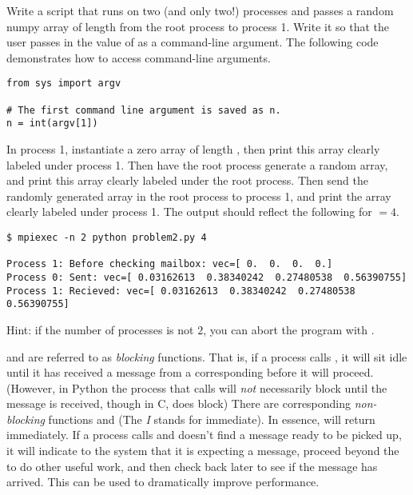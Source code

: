 \begin{problem}
Write a script that runs on two (and only two!) processes and passes a random numpy array of length  from the root process to process 1.
Write it so that the user passes in the value of  as a command-line argument. 
The following code demonstrates how to access command-line arguments.
\begin{lstlisting}
from sys import argv
    
# The first command line argument is saved as n.
n = int(argv[1])
\end{lstlisting}
In process 1, instantiate a zero array of length , then print this array clearly labeled under process 1.
Then have the root process generate a random array, and print this array clearly labeled under the root process.
Then send the randomly generated array in the root process to process 1, and print the array clearly labeled under process 1.
The output should reflect the following for  $ = 4$.
\begin{lstlisting}[style=ShellOutput]
$ mpiexec -n 2 python problem2.py 4

Process 1: Before checking mailbox: vec=[ 0.  0.  0.  0.]
Process 0: Sent: vec=[ 0.03162613  0.38340242  0.27480538  0.56390755]
Process 1: Recieved: vec=[ 0.03162613  0.38340242  0.27480538  0.56390755]
\end{lstlisting}

\noindent Hint: if the number of processes is not $2$, you can abort the program with .
\end{problem}

\begin{info}
 and  are referred to as \emph{blocking} functions.
That is, if a process calls , it will sit idle until it has received a message from a corresponding  before it will proceed.
(However, in Python the process that calls  will \emph{not} necessarily block until the message is received, though in C,  does block)
There are corresponding \emph{non-blocking} functions  and  (The \emph{I} stands for immediate).
In essence,  will return immediately.
If a process calls  and doesn't find a message ready to be picked up, it will indicate to the system that it is expecting a message, proceed beyond the  to do other useful work, and then check back later to see if the message has arrived.
This can be used to dramatically improve performance.
\end{info}

